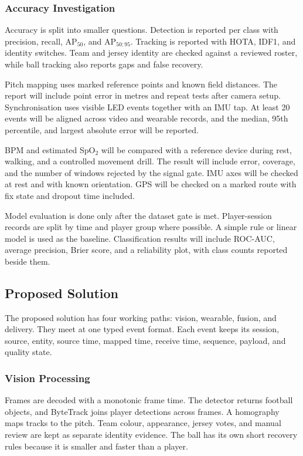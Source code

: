 \subsubsection{Accuracy Investigation}
Accuracy is split into smaller questions. Detection is reported per class with
precision, recall, AP$_{50}$, and AP$_{50:95}$. Tracking is reported with HOTA,
IDF1, and identity switches. Team and jersey identity are checked against a
reviewed roster, while ball tracking also reports gaps and false recovery.

Pitch mapping uses marked reference points and known field distances. The
report will include point error in metres and repeat tests after camera setup.
Synchronisation uses visible LED events together with an IMU tap. At least 20
events will be aligned across video and wearable records, and the median, 95th
percentile, and largest absolute error will be reported.

BPM and estimated SpO$_2$ will be compared with a reference device during rest,
walking, and a controlled movement drill. The result will include error,
coverage, and the number of windows rejected by the signal gate. IMU axes will
be checked at rest and with known orientation. GPS will be checked on a marked
route with fix state and dropout time included.

Model evaluation is done only after the dataset gate is met. Player-session
records are split by time and player group where possible. A simple rule or
linear model is used as the baseline. Classification results will include
ROC-AUC, average precision, Brier score, and a reliability plot, with class
counts reported beside them.

\subsection{Proposed Solution}
The proposed solution has four working paths: vision, wearable, fusion, and
delivery. They meet at one typed event format. Each event keeps its session,
source, entity, source time, mapped time, receive time, sequence, payload, and
quality state.

\subsubsection{Vision Processing}
Frames are decoded with a monotonic frame time. The detector returns football
objects, and ByteTrack joins player detections across frames. A homography maps
tracks to the pitch. Team colour, appearance, jersey votes, and manual review
are kept as separate identity evidence. The ball has its own short recovery
rules because it is smaller and faster than a player.

